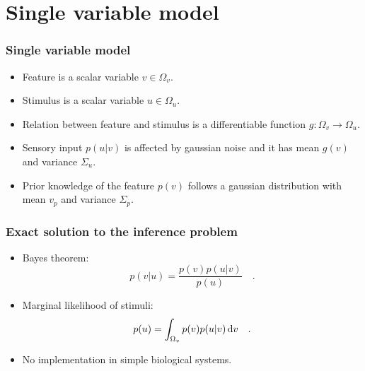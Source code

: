 \documentclass[aspectratio=43]{beamer}
\begin{document}
\section{Single variable model}
\begin{frame}
  \frametitle{Single variable model}
  \begin{itemize}
    \item<1-> Feature is a scalar variable $v \in \Omega_v$.
    \item<1-> Stimulus is a scalar variable $u \in \Omega_u$.
    \item<2-> Relation between feature and stimulus is a differentiable function $g : \Omega_v \to \Omega_u$.
    \item<3-> Sensory input $p(u|v)$ is affected by gaussian noise and it has mean $g(v)$ and variance $\Sigma_u$.
    \item<4-> Prior knowledge of the feature $p(v)$ follows a gaussian distribution with mean $v_p$ and variance $\Sigma_p$.
  \end{itemize}
\end{frame}

\begin{frame}
  \frametitle{Exact solution to the inference problem}
  \begin{itemize}
    \item<1-> Bayes theorem:
      \begin{equation}
        \label{eq:bayes}
        p(v|u) = \frac{p(v) p(u|v)}{p(u)}
        \quad .
      \end{equation}
    \item<2-> Marginal likelihood of stimuli:
      \begin{equation}
        \label{eq:marginal}
        p(u) = \int_{\Omega_v} p(v) p(u|v) \odif{v}
        \quad .
      \end{equation}
    \item<3-> No implementation in simple biological systems.
  \end{itemize}
\end{frame}
\end{document}
